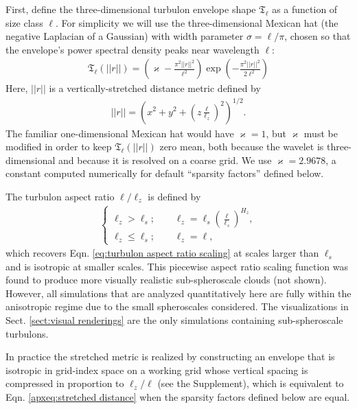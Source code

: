 \documentclass[acp, manuscript, english]{copernicus}
\begin{document}
First, define the three-dimensional turbulon envelope shape $\mathfrak{T}_\ell$ as a function of size class $\ell$. For simplicity we will use the three-dimensional Mexican hat (the negative Laplacian of a Gaussian) with width parameter $\sigma = \ell/\pi$, chosen so that the envelope's power spectral density peaks near wavelength $\ell$:
\begin{align}
  \mathfrak{T}_\ell(||r||) = \left(\varkappa -\frac{\pi^2||r||^2}{\ell^2}\right)\exp \left(-\frac{\pi^2||r||^2}{2\ell^2}\right) \label{apxeq:turbulon shape}
\end{align}
Here, $||r||$ is a vertically-stretched distance metric defined by
\begin{align}
  ||r|| = \left(x^{2} +y^{2} + \left(z\frac{\ell}{\ell_z}\right)^{2}\right)^{1/2}. \label{apxeq:stretched distance}
\end{align}
The familiar one-dimensional Mexican hat would have $\varkappa = 1$, but $\varkappa$ must be modified in order to keep $\mathfrak{T}_\ell(||r||)$ zero mean, both because the wavelet is three-dimensional and because it is resolved on a coarse grid. We use $\varkappa=2.9678$, a constant computed numerically for default ``sparsity factors'' defined below.

The turbulon aspect ratio $\ell/\ell_z$ is defined by
\begin{align}
  \begin{cases}
    \ell_z>\ell_s; \qquad \ell_z = \ell_s \left(\frac{\ell}{\ell_s}\right)^{H_z}, \\
    \ell_z \le \ell_s; \qquad \ell_z = \ell,
  \end{cases}
   \label{apxeq:vertical turbulon size class}
\end{align}
which recovers Eqn. \ref{eq:turbulon aspect ratio scaling} at scales larger than $\ell_s$ and is isotropic at smaller scales. This piecewise aspect ratio scaling function was found to produce more visually realistic sub-spheroscale clouds (not shown). However, all simulations that are analyzed quantitatively here are fully within the anisotropic regime due to the small spheroscales considered. The visualizations in Sect. \ref{sect:visual renderings} are the only simulations containing sub-spheroscale turbulons.

In practice the stretched metric is realized by constructing an envelope that is isotropic in grid-index space on a working grid whose vertical spacing is compressed in proportion to $\ell_z/\ell$ (see the Supplement), which is equivalent to Eqn. \ref{apxeq:stretched distance} when the sparsity factors defined below are equal.
\end{document}
